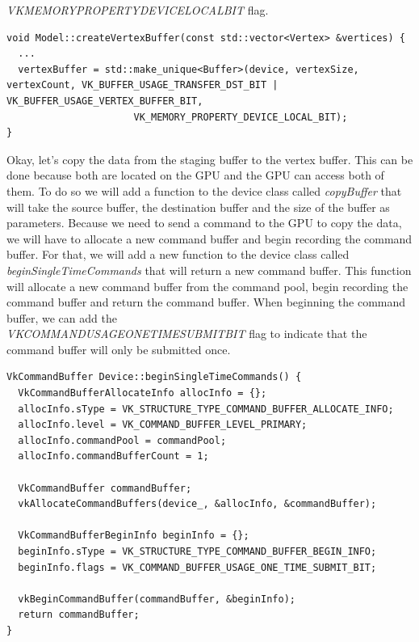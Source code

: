\documentclass[12pt]{report} \usepackage{preamble}
\begin{document}
\textit{VK\textunderscore MEMORY\textunderscore PROPERTY\textunderscore DEVICE\textunderscore LOCAL\textunderscore BIT} flag.

\begin{lstlisting}[Language=C++]
void Model::createVertexBuffer(const std::vector<Vertex> &vertices) {
  ...
  vertexBuffer = std::make_unique<Buffer>(device, vertexSize, vertexCount, VK_BUFFER_USAGE_TRANSFER_DST_BIT | VK_BUFFER_USAGE_VERTEX_BUFFER_BIT, 
                      VK_MEMORY_PROPERTY_DEVICE_LOCAL_BIT);
}
\end{lstlisting}

Okay, let's copy the data from the staging buffer to the vertex buffer. This can be done because both are located on the GPU and the GPU can access both of them.
To do so we will add a function to the device class called \textit{copyBuffer} that will take the source buffer, the destination buffer and the size of the buffer as parameters.
Because we need to send a command to the GPU to copy the data, we will have to allocate a new command buffer and begin recording the command buffer. For that, we will
add a new function to the device class called \textit{beginSingleTimeCommands} that will return a new command buffer. This function will allocate a new command buffer from the command pool,
begin recording the command buffer and return the command buffer. When beginning the command buffer, we can add the \\
\textit{VK\textunderscore COMMAND\textunderscore USAGE\textunderscore ONE\textunderscore TIME\textunderscore SUBMIT\textunderscore BIT} flag to indicate that the command buffer will only be submitted once.

\begin{lstlisting}[Language=C++]
VkCommandBuffer Device::beginSingleTimeCommands() {
  VkCommandBufferAllocateInfo allocInfo = {};
  allocInfo.sType = VK_STRUCTURE_TYPE_COMMAND_BUFFER_ALLOCATE_INFO;
  allocInfo.level = VK_COMMAND_BUFFER_LEVEL_PRIMARY;
  allocInfo.commandPool = commandPool;
  allocInfo.commandBufferCount = 1;

  VkCommandBuffer commandBuffer;
  vkAllocateCommandBuffers(device_, &allocInfo, &commandBuffer);

  VkCommandBufferBeginInfo beginInfo = {};
  beginInfo.sType = VK_STRUCTURE_TYPE_COMMAND_BUFFER_BEGIN_INFO;
  beginInfo.flags = VK_COMMAND_BUFFER_USAGE_ONE_TIME_SUBMIT_BIT;

  vkBeginCommandBuffer(commandBuffer, &beginInfo);
  return commandBuffer;
}
\end{lstlisting}
\end{document}
